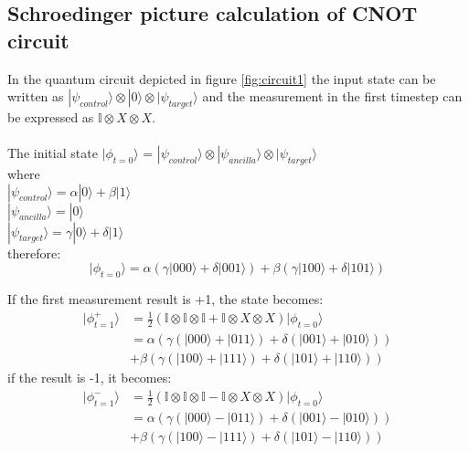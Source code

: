 \subsection{Schroedinger picture calculation of CNOT circuit}
\label{sec:calc1}

In the quantum circuit depicted in figure \ref{fig:circuit1} the input
state can be written as $|\psi_{control}\rangle \otimes |0\rangle 
\otimes |\psi_{target}\rangle$ and the measurement in the first 
timestep can be expressed as $\mathbb{I}\otimes X \otimes X$.\\
\\
The initial state $|\phi_{t=0}\rangle$ = $|\psi_{control}\rangle \otimes |\psi_{ancilla}\rangle \otimes
|\psi_{target}\rangle$\\
where\\
$|\psi_{control}\rangle = \alpha|0\rangle+\beta|1\rangle$
\\
$|\psi_{ancilla}\rangle = |0\rangle$
\\
$|\psi_{target}\rangle = \gamma|0\rangle+\delta|1\rangle$
\\
therefore:
\begin{equation}
|\phi_{t=0}\rangle = \alpha \left( \gamma |000\rangle + \delta |001\rangle\right)+
\beta \left( \gamma |100\rangle + \delta |101\rangle \right)
\end{equation}

If the first measurement result is +1, the state becomes:
\begin{align*}
	|\phi^{+}_{t=1}\rangle 
	&= \frac{1}{2}\left(\mathbb{I}\otimes\mathbb{I}\otimes\mathbb{I}+
	\mathbb{I}\otimes X \otimes X\right)|\phi_{t=0}\rangle\\
	&= \alpha \left( 
	\gamma \left( |000\rangle + |011\rangle \right) +
	\delta \left( |001\rangle + |010\rangle \right) \right) \\
	&+ \beta \left(
	\gamma \left( |100\rangle + |111\rangle \right) +
	\delta \left( |101\rangle + |110\rangle \right) \right)
\end{align*}
if the result is -1, it becomes:
\begin{align*}
	|\phi^{-}_{t=1}\rangle 
	&= \frac{1}{2}\left(\mathbb{I}\otimes\mathbb{I}\otimes\mathbb{I}-
	\mathbb{I}\otimes X \otimes X\right)|\phi_{t=0}\rangle\\
	&= \alpha \left( 
	\gamma \left( |000\rangle - |011\rangle \right) +
	\delta \left( |001\rangle - |010\rangle \right) \right) \\
	&+ \beta \left(
	\gamma \left( |100\rangle - |111\rangle \right) +
	\delta \left( |101\rangle - |110\rangle \right) \right)
\end{align*}

